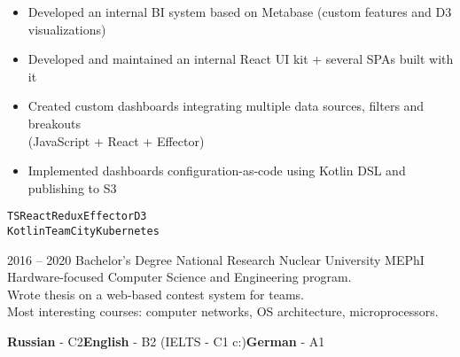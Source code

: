 \documentclass[2pt]{template}
\begin{document}
\begin{entrylist}
{		\begin{itemize}[noitemsep,topsep=5pt,leftmargin=8pt]
			\item Developed an internal BI system based on Metabase (custom features and D3 visualizations)
			\item Developed and maintained an internal React UI kit + several SPAs built with it
			\item Created custom dashboards integrating multiple data sources, filters and breakouts\\ (JavaScript + React + Effector)\\
			\item Implemented dashboards configuration-as-code using Kotlin DSL and publishing to S3
		\end{itemize}
		\texttt{TS}\slashsep\texttt{React}\slashsep\texttt{Redux}\slashsep\texttt{Effector}\slashsep\texttt{D3}\\
		{\color{gray} \texttt{Kotlin}\slashsep\texttt{TeamCity}\slashsep\texttt{Kubernetes}}}
\end{entrylist}



\begin{entrylist}
	\entry
	{2016 -- 2020}
	{Bachelor's Degree}
	{National Research Nuclear University MEPhI}
	{Hardware-focused Computer Science and Engineering program.\\
	Wrote thesis on a web-based contest system for teams.\\
	Most interesting courses: computer networks, OS architecture, microprocessors.}
\end{entrylist}


\begin{minipage}[t]{0.6\textwidth}
	\vspace{-\baselineskip}


	\textbf{Russian} - C2\slashsep\textbf{English} - B2 (IELTS - C1 c:)\slashsep\textbf{German} - A1
\end{minipage}


\end{document}
